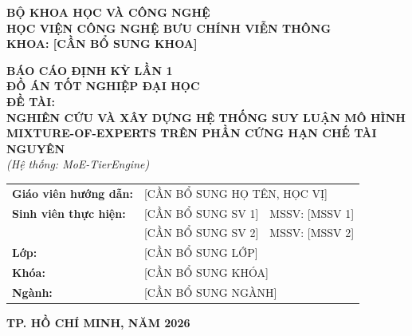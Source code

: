 \begin{titlepage}
\begin{center}
    \textbf{\fontsize{13pt}{16pt}\selectfont BỘ KHOA HỌC VÀ CÔNG NGHỆ}\\[0.2cm]
    \textbf{\fontsize{13pt}{16pt}\selectfont HỌC VIỆN CÔNG NGHỆ BƯU CHÍNH VIỄN THÔNG}\\[0.2cm]
    \textbf{\fontsize{13pt}{16pt}\selectfont KHOA: [CẦN BỔ SUNG KHOA]}\\[1.5cm]

    \vspace{1.5cm}

    \textbf{\fontsize{18pt}{22pt}\selectfont BÁO CÁO ĐỊNH KỲ LẦN 1}\\[0.5cm]
    \textbf{\fontsize{15pt}{18pt}\selectfont ĐỒ ÁN TỐT NGHIỆP ĐẠI HỌC}\\[1.5cm]

    \textbf{\fontsize{16pt}{20pt}\selectfont ĐỀ TÀI:}\\[0.3cm]
    \textbf{\fontsize{16pt}{20pt}\selectfont NGHIÊN CỨU VÀ XÂY DỰNG HỆ THỐNG SUY LUẬN MÔ HÌNH MIXTURE-OF-EXPERTS TRÊN PHẦN CỨNG HẠN CHẾ TÀI NGUYÊN}\\[0.5cm]
    \textit{\fontsize{12pt}{15pt}\selectfont (Hệ thống: MoE-TierEngine)}\\[2.5cm]

    \begin{table}[h!]
    \centering
    \fontsize{13pt}{16pt}\selectfont
    \begin{tabular}{lll}
        \textbf{Giáo viên hướng dẫn:} & \multicolumn{2}{l}{[CẦN BỔ SUNG HỌ TÊN, HỌC VỊ]} \\[0.3cm]
        \textbf{Sinh viên thực hiện:} & [CẦN BỔ SUNG SV 1] & MSSV: [MSSV 1] \\
                                       & [CẦN BỔ SUNG SV 2] & MSSV: [MSSV 2] \\[0.3cm]
        \textbf{Lớp:}                  & \multicolumn{2}{l}{[CẦN BỔ SUNG LỚP]} \\
        \textbf{Khóa:}                 & \multicolumn{2}{l}{[CẦN BỔ SUNG KHÓA]} \\
        \textbf{Ngành:}                & \multicolumn{2}{l}{[CẦN BỔ SUNG NGÀNH]}
    \end{tabular}
    \end{table}

    \vfill
    \textbf{\fontsize{13pt}{16pt}\selectfont TP. HỒ CHÍ MINH, NĂM 2026}
\end{center}
\end{titlepage}

